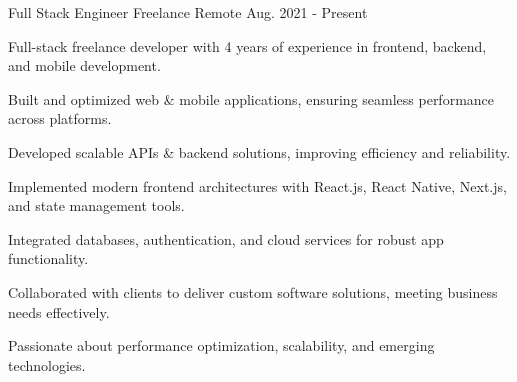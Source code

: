 \begin{cventries}
  \cventry
    {Full Stack Engineer} %
    {Freelance} %
    {Remote} %
    {Aug. 2021 - Present} %
    {
      \begin{cvitems} %
        \item {Full-stack freelance developer with 4 years of experience in frontend, backend, and mobile development.}
        \item {Built and optimized web \& mobile applications, ensuring seamless performance across platforms.}
        \item {Developed scalable APIs \& backend solutions, improving efficiency and reliability.}
        \item {Implemented modern frontend architectures with React.js, React Native, Next.js, and state management tools.}
        \item {Integrated databases, authentication, and cloud services for robust app functionality.}
        \item {Collaborated with clients to deliver custom software solutions, meeting business needs effectively.}
        \item {Passionate about performance optimization, scalability, and emerging technologies.}
      \end{cvitems}
    }


\end{cventries}
